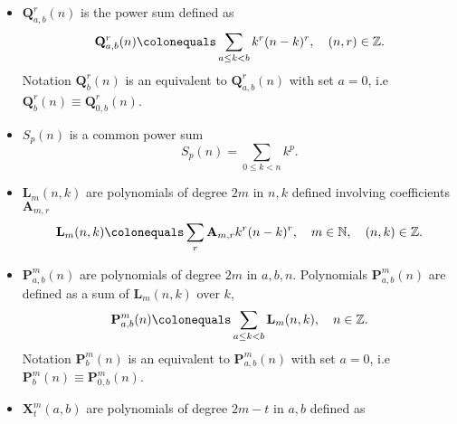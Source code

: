 \documentclass[12pt, letterpaper]{amsart}
\newenvironment{myitemize}
{ \begin{itemize}
    \setlength{\itemsep}{4pt}
    \setlength{\parskip}{4pt}
    \setlength{\parsep}{4pt}     }
{ \end{itemize}                  }
\theoremstyle{definition}
\theoremstyle{remark}
\numberwithin{equation}{section}
\begin{document}
\begin{myitemize}
\begin{equation*}
\mathbf{A}_{m,r}\colonequals
\begin{cases}
(2r+1)\binom{2r}{r}, & \mathrm{if } \ r=m, \\
(2r+1)\binom{2r}{r} \sum\limits_{d=2r+1}^{m} \mathbf{A}_{m,d} \binom{d}{2r+1} \frac{(-1)^{d-1}}{d-r} B_{2d-2r}, & \mathrm{if } \ 0 \leq r < m, \\
0, & \mathrm{if } \ r<0 \ \mathrm{or } \ r>m.
\end{cases}
\end{equation*}
where $B_t$ are Bernoulli numbers. We assume that $B_1=\tfrac12$. For $m\geq 11$ the $\mathbf{A}_{m,r}$ takes the fractional values for certain $r$.
\item $\mathbf{Q}^{r}_{a,b}(n)$ is the power sum defined as
\begin{equation}
\label{q_definition}
\mathbf{Q}^{r}_{a,b}(n)\colonequals\sum\limits_{a\leq k<b} k^r(n-k)^r, \quad (n,r)\in\mathbb{Z}.
\end{equation}
Notation $\mathbf{Q}^{r}_{b}(n)$ is an equivalent to $\mathbf{Q}^{r}_{a,b}(n)$ with set $a=0$, i.e $\mathbf{Q}^{r}_{b}(n) \equiv \mathbf{Q}^{r}_{0,b}(n)$.
\item $S_p(n)$ is a common power sum
\begin{equation*}
S_p(n) = \sum_{0\leq k < n} k^p.
\end{equation*}
\item $\mathbf{L}_m(n,k)$ are polynomials of degree $2m$ in $n,k$ defined involving coefficients $\mathbf{A}_{m,r}$
\begin{equation*}
\mathbf{L}_m(n,k)\colonequals\sum\limits_{r} \mathbf{A}_{m,r} k^r(n-k)^r, \quad m\in\mathbb{N}, \quad (n,k)\in\mathbb{Z}.
\end{equation*}
\item $\mathbf{P}^{m}_{a,b}(n)$ are polynomials of degree $2m$ in $a, b, n$. Polynomials $\mathbf{P}^{m}_{a,b}(n)$ are defined as a sum of $\mathbf{L}_m(n,k)$ over $k$,
\begin{equation}
\label{p_definition}
\mathbf{P}^{m}_{a,b}(n)\colonequals \sum\limits_{a\leq k<b} \mathbf{L}_{m}(n,k), \quad n\in\mathbb{Z}.
\end{equation}
Notation $\mathbf{P}^{m}_{b}(n)$ is an equivalent to $\mathbf{P}^{m}_{a,b}(n)$ with set $a=0$, i.e $\mathbf{P}^{m}_{b}(n) \equiv \mathbf{P}^{m}_{0,b}(n)$.
\item $\mathbf{X}^{m}_{t}(a,b)$ are polynomials of degree $2m-t$ in $a,b$ defined as
\begin{equation*}

\end{equation*}
\end{myitemize}
\end{document}
